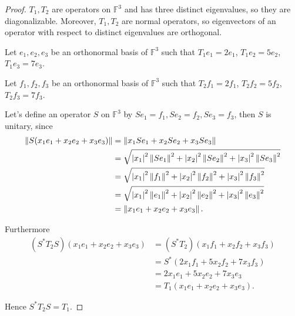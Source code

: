 \begin{proof}
    $T_{1}, T_{2}$ are operators on $\mathbb{F}^{3}$ and has three distinct eigenvalues, so they are diagonalizable. Moreover, $T_{1}, T_{2}$ are normal operators, so eigenvectors of an operator with respect to distinct eigenvalues are orthogonal.

    Let $e_{1}, e_{2}, e_{3}$ be an orthonormal basis of $\mathbb{F}^{3}$ such that $T_{1}e_{1} = 2e_{1}$, $T_{1}e_{2} = 5e_{2}$, $T_{1}e_{3} = 7e_{3}$.

    Let $f_{1}, f_{2}, f_{3}$ be an orthonormal basis of $\mathbb{F}^{3}$ such that $T_{2}f_{1} = 2f_{1}$, $T_{2}f_{2} = 5f_{2}$, $T_{2}f_{3} = 7f_{3}$.

    Let's define an operator $S$ on $\mathbb{F}^{3}$ by $Se_{1} = f_{1}, Se_{2} = f_{2}, Se_{3} = f_{3}$, then $S$ is unitary, since
    \begin{align*}
        \left\Vert{S(x_{1}e_{1} + x_{2}e_{2} + x_{3}e_{3})}\right\Vert & = \left\Vert{x_{1}Se_{1} + x_{2}Se_{2} + x_{3}Se_{3}}\right\Vert                                                                \\
                                                       & = \sqrt{\left\vert{x_{1}}\right\vert^{2}\left\Vert{Se_{1}}\right\Vert^{2} + \left\vert{x_{2}}\right\vert^{2}\left\Vert{Se_{2}}\right\Vert^{2} + \left\vert{x_{3}}\right\vert^{2}\left\Vert{Se_{3}}\right\Vert^{2}} \\
                                                       & = \sqrt{\left\vert{x_{1}}\right\vert^{2}\left\Vert{f_{1}}\right\Vert^{2} + \left\vert{x_{2}}\right\vert^{2}\left\Vert{f_{2}}\right\Vert^{2} + \left\vert{x_{3}}\right\vert^{2}\left\Vert{f_{3}}\right\Vert^{2}}    \\
                                                       & = \sqrt{\left\vert{x_{1}}\right\vert^{2}\left\Vert{e_{1}}\right\Vert^{2} + \left\vert{x_{2}}\right\vert^{2}\left\Vert{e_{2}}\right\Vert^{2} + \left\vert{x_{3}}\right\vert^{2}\left\Vert{e_{3}}\right\Vert^{2}}    \\
                                                       & = \left\Vert{x_{1}e_{1} + x_{2}e_{2} + x_{3}e_{3}}\right\Vert.
    \end{align*}

    Furthermore
    \begin{align*}
        (S^{*}T_{2}S)(x_{1}e_{1} + x_{2}e_{2} + x_{3}e_{3}) & = (S^{*}T_{2})(x_{1}f_{1} + x_{2}f_{2} + x_{3}f_{3}) \\
                                                            & = S^{*}(2x_{1}f_{1} + 5x_{2}f_{2} + 7x_{3}f_{3})     \\
                                                            & = 2x_{1}e_{1} + 5x_{2}e_{2} + 7x_{3}e_{3}            \\
                                                            & = T_{1}(x_{1}e_{1} + x_{2}e_{2} + x_{3}e_{3}).
    \end{align*}

    Hence $S^{*}T_{2}S = T_{1}$.
\end{proof}
\newpage

